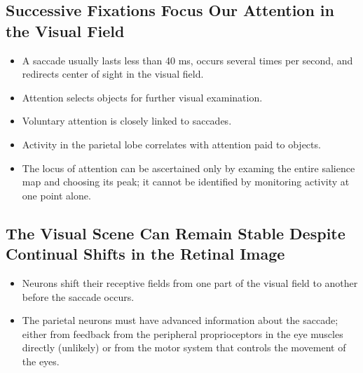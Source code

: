 \documentclass[12pt,a4paper]{article}
\begin{document}
\subsection{Successive Fixations Focus Our Attention in the Visual Field}
\begin{itemize}
    \item A saccade usually lasts less than 40 ms, occurs several times per second, and redirects center of sight in the visual field.
    \item Attention selects objects for further visual examination.
    \item Voluntary attention is closely linked to saccades.
    \item Activity in the parietal lobe correlates with attention paid to objects.
    \item The locus of attention can be ascertained only by examing the entire salience map and choosing its peak; it cannot be identified by monitoring activity at one point alone.
\end{itemize}

\subsection{The Visual Scene Can Remain Stable Despite Continual Shifts in the Retinal Image}
\begin{itemize}
    \item Neurons shift their receptive fields from one part of the visual field to another before the saccade occurs.
    \item The parietal neurons must have advanced information about the saccade; either from feedback from the peripheral proprioceptors in the eye muscles directly (unlikely) or from the motor system that controls the movement of the eyes.
\end{itemize}
\end{document}
